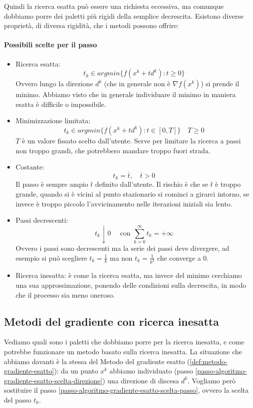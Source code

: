 Quindi la ricerca esatta può essere una richiesta eccessiva, ma
comunque dobbiamo porre dei paletti pi\`u rigidi della semplice
decrescita. Esistono diverse propriet\`a, di diversa rigidit\`a, che i
metodi possono offrire:
\paragraph{Possibili scelte per il passo}
\begin{itemize}
\item Ricerca esatta: $$ t_k \in argmin \{ f (x^{k} + td^{k}) : t \geq
0 \}$$ Ovvero lungo la direzione $d^k$ (che in generale non \`e $\nabla
f(x^k)$) si prende il minimo. Abbiamo visto che in generale
individuare il minimo in maniera esatta \`e difficile o impossibile.
\item Minimizzazione limitata: $$ t_k \in argmin \{ f (x^{k} + td^{k})
: t \in [0,T]\} \quad T \geq 0 $$ $T$ \`e un valore fissato scelto
dall'utente. Serve per limitare la ricerca a passi non troppo grandi,
che potrebbero mandare troppo fuori strada.
\item Costante: $$t_k = \overline{t}, \quad \overline{t}> 0$$ Il passo
\`e sempre ampio $\overline{t}$ definito dall'utente. Il rischio \`e che
se $\overline{t}$ \`e troppo grande, quando si \`e vicini al punto
stazionario si cominci a girarci intorno, se invece \`e troppo piccolo
l'avvicinamento nelle iterazioni iniziali sia lento.
\item Passi decrescenti: $$ t_{k} \downarrow 0 \quad\text{ con }
\sum_{k=0}^{\infty} t_k = + \infty$$ Ovvero i passi sono decrescenti
ma la serie dei passi deve divergere, ad esempio si può scegliere
$t_{k} = \frac{1}{k}$ ma non $t_{k} = \frac{1}{k^2}$ che converge a
$0$.
\item Ricerca inesatta: \`e come la ricerca esatta, ma invece del minimo
cerchiamo una sua approssimazione, ponendo delle condizioni sulla
decrescita, in modo che il processo sia meno oneroso.
\end{itemize}

\subsection{Metodi del gradiente con ricerca inesatta} Vediamo quali
sono i paletti che dobbiamo porre per la ricerca inesatta, e come
potrebbe funzionare un metodo basato sulla ricerca inesatta. La
situazione che abbiamo davanti \`e la stessa del Metodo del gradiente
esatto (\ref{def:metodo-gradiente-esatto}): da un punto $x^k$ abbiamo
individuato (passo
\ref{passo-algoritmo-gradiente-esatto-scelta-direzione}) una direzione
di discesa $d^k$. Vogliamo però sostituire il passo
\ref{passo-algoritmo-gradiente-esatto-scelta-passo}, ovvero la scelta
del passo $t_k$.

